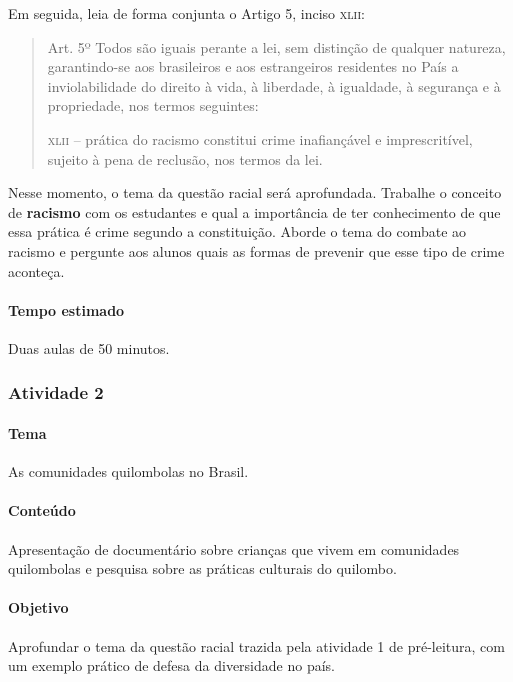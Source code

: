 \documentclass[11pt]{extarticle}
\begin{document}
Em seguida, leia de forma conjunta o Artigo 5, inciso \textsc{xlii}:

\begin{quote}Art. 5º Todos são iguais perante a lei, sem distinção de qualquer natureza, garantindo-se aos brasileiros e aos estrangeiros residentes no País a inviolabilidade do direito à vida, à liberdade, à igualdade, à segurança e à propriedade, nos termos seguintes:

\textsc{xlii} -- prática do racismo constitui crime inafiançável e imprescritível, sujeito à pena de reclusão, nos termos da lei.\end{quote}

Nesse momento, o tema da questão racial será aprofundada. Trabalhe o conceito de \textbf{racismo} com os estudantes e qual a importância de ter conhecimento de que essa prática é crime segundo a constituição. Aborde o tema do combate ao racismo e pergunte aos alunos quais as formas de prevenir que esse tipo de crime aconteça.

\paragraph{Tempo estimado} Duas aulas de 50 minutos.

\subsubsection{Atividade 2}


\paragraph{Tema} As comunidades quilombolas no Brasil.

\paragraph{Conteúdo} Apresentação de documentário sobre crianças que vivem em comunidades quilombolas e pesquisa sobre as práticas culturais do quilombo.

\paragraph{Objetivo} Aprofundar o tema da questão racial trazida pela atividade 1 de pré-leitura, com um exemplo prático de defesa da diversidade no país.
\end{document}
